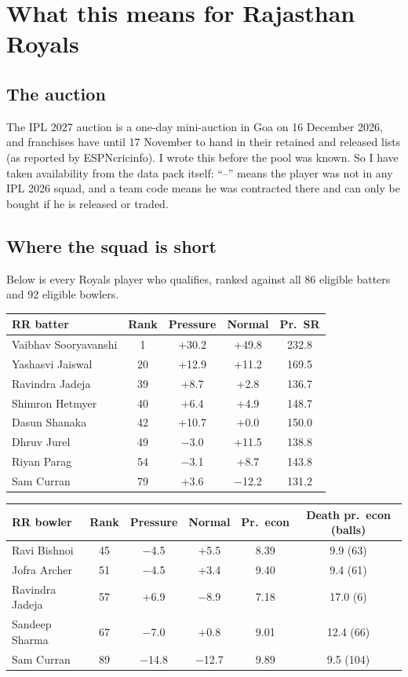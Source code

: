 \documentclass[10.5pt,a4paper]{article}
\begin{document}
\section{What this means for Rajasthan Royals}

\subsection{The auction}

The IPL 2027 auction is a one-day mini-auction in Goa on 16 December 2026, and franchises have until 17 November to hand in their retained and released lists (as reported by ESPNcricinfo). I wrote this before the pool was known. So I have taken availability from the data pack itself: ``--'' means the player was not in any IPL 2026 squad, and a team code means he was contracted there and can only be bought if he is released or traded.

\subsection{Where the squad is short}

Below is every Royals player who qualifies, ranked against all 86 eligible batters and 92 eligible bowlers.

\begin{table}[H]\centering\small
\begin{tabular}{l c c c c}
\toprule
RR batter & Rank & Pressure & Normal & Pr.\ SR\\
\midrule
Vaibhav Sooryavanshi & 1 & +30.2 & +49.8 & 232.8 \\
Yashasvi Jaiswal & 20 & +12.9 & +11.2 & 169.5 \\
Ravindra Jadeja & 39 & +8.7 & +2.8 & 136.7 \\
Shimron Hetmyer & 40 & +6.4 & +4.9 & 148.7 \\
Dasun Shanaka & 42 & +10.7 & +0.0 & 150.0 \\
Dhruv Jurel & 49 & $-$3.0 & +11.5 & 138.8 \\
Riyan Parag & 54 & $-$3.1 & +8.7 & 143.8 \\
Sam Curran & 79 & +3.6 & $-$12.2 & 131.2\\
\bottomrule
\end{tabular}

\vspace{8pt}
\begin{tabular}{l c c c c c}
\toprule
RR bowler & Rank & Pressure & Normal & Pr.\ econ & Death pr.\ econ (balls)\\
\midrule
Ravi Bishnoi & 45 & $-$4.5 & +5.5 & 8.39 & 9.9 (63) \\
Jofra Archer & 51 & $-$4.5 & +3.4 & 9.40 & 9.4 (61) \\
Ravindra Jadeja & 57 & +6.9 & $-$8.9 & 7.18 & 17.0 (6) \\
Sandeep Sharma & 67 & $-$7.0 & +0.8 & 9.01 & 12.4 (66) \\
Sam Curran & 89 & $-$14.8 & $-$12.7 & 9.89 & 9.5 (104)\\
\bottomrule
\end{tabular}
\end{table}
\end{document}
